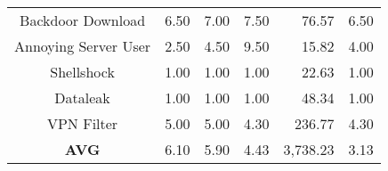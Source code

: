 \begin{table}[t]
{\begin{tabular}{crrrrr}
Backdoor Download    & 6.50                                                             & 7.00                                                                   & 7.50                                                             & 76.57                                                           & 6.50                                                         \\ 
Annoying Server User & 2.50                                                             & 4.50                                                                   & 9.50                                                             & 15.82                                                            & 4.00                                                         \\ 
 
Shellshock           & 1.00                                                             & 1.00                                                                   & 1.00                                                             & 22.63                                                            & 1.00                                                         \\ 
Dataleak             & 1.00                                                             & 1.00                                                                   & 1.00                                                             & 48.34                                                            & 1.00                                                         \\ 
 
VPN Filter            & 5.00                                                             & 5.00                                                                   & 4.30                                                             & 236.77                                                           & 4.30                                                         \\ 
\textbf{AVG}         & 6.10                                                             & 5.90                                                                   & 4.43                                                             & 3,738.23                                                         & 3.13                                                         \\ \hline
\end{tabular}
}
\end{table}
